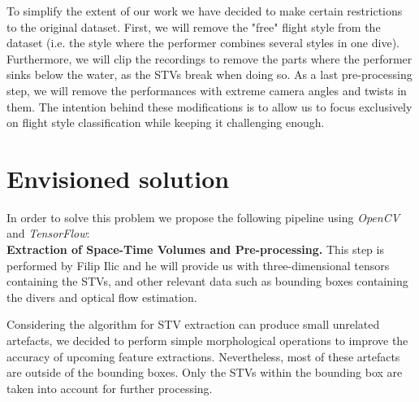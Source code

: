 \documentclass[10pt]{article}
\begin{document}
To simplify the extent of our work we have decided to make certain restrictions to the original dataset. First, we will remove the "free" flight style from the dataset (i.e. the style where the performer combines several styles in one dive). Furthermore, we will clip the recordings to remove the parts where the performer sinks below the water, as the STVs break when doing so. As a last pre-processing step, we will remove the performances with extreme camera angles and twists in them. The intention behind these modifications is to allow us to focus exclusively on flight style classification while keeping it challenging enough.

\section{Envisioned solution}

In order to solve this problem we propose the following pipeline using \emph{OpenCV} and \emph{TensorFlow}:\\

\textbf{Extraction of Space-Time Volumes and Pre-processing.} This step is performed by Filip Ilic and he will provide us with three-dimensional tensors containing the STVs, and other relevant data such as bounding boxes containing the divers and optical flow estimation.

Considering the algorithm for STV extraction can produce small unrelated artefacts, we decided to perform simple morphological operations to improve the accuracy of upcoming feature extractions. Nevertheless, most of these artefacts are outside of the bounding boxes. Only the STVs within the bounding box are taken into account for further processing.\\
\end{document}
